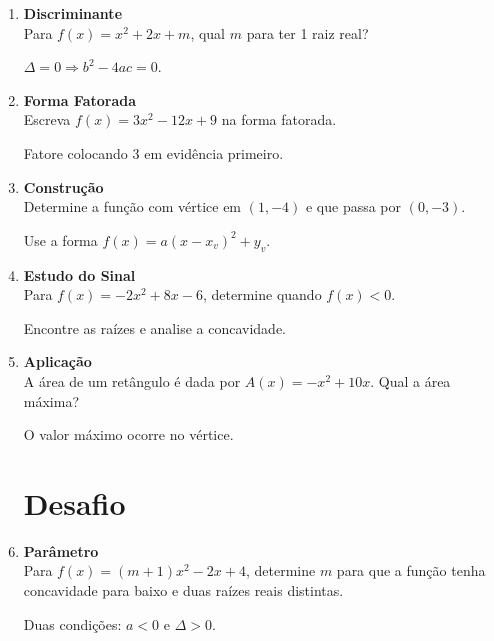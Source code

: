 \documentclass[11pt]{article}
\begin{document}
\begin{multicols}{2}
\begin{enumerate}
\item \textbf{Discriminante}\\
Para $f(x) = x^2 + 2x + m$, qual $m$ para ter 1 raiz real?
\begin{tcolorbox}[colback=explanationbg,colframe=titleblue,title=Dica:]
$\Delta = 0 \Rightarrow b^2 - 4ac = 0$.
\end{tcolorbox}

\item \textbf{Forma Fatorada}\\
Escreva $f(x) = 3x^2 - 12x + 9$ na forma fatorada.
\begin{tcolorbox}[colback=explanationbg,colframe=titleblue,title=Dica:]
Fatore colocando 3 em evidência primeiro.
\end{tcolorbox}

\item \textbf{Construção}\\
Determine a função com vértice em $(1, -4)$ e que passa por $(0, -3)$.
\begin{tcolorbox}[colback=explanationbg,colframe=titleblue,title=Dica:]
Use a forma $f(x) = a(x - x_v)^2 + y_v$.
\end{tcolorbox}

\item \textbf{Estudo do Sinal}\\
Para $f(x) = -2x^2 + 8x - 6$, determine quando $f(x) < 0$.
\begin{tcolorbox}[colback=explanationbg,colframe=titleblue,title=Dica:]
Encontre as raízes e analise a concavidade.
\end{tcolorbox}

\item \textbf{Aplicação}\\
A área de um retângulo é dada por $A(x) = -x^2 + 10x$. Qual a área máxima?
\begin{tcolorbox}[colback=explanationbg,colframe=titleblue,title=Dica:]
O valor máximo ocorre no vértice.
\end{tcolorbox}

\section*{Desafio}

\item \textbf{Parâmetro}\\
Para $f(x) = (m+1)x^2 - 2x + 4$, determine $m$ para que a função tenha concavidade para baixo e duas raízes reais distintas.
\begin{tcolorbox}[colback=explanationbg,colframe=titleblue,title=Dica:]
Duas condições: $a < 0$ e $\Delta > 0$.
\end{tcolorbox}

\end{enumerate}
\end{multicols}
\end{document}
